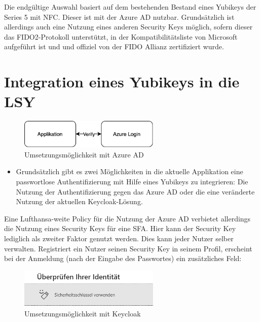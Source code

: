 Die endgültige Auswahl basiert  auf dem bestehenden Bestand eines Yubikeys der Series 5 mit NFC. Dieser ist mit der Azure \ac{AD} nutzbar. Grundsätzlich ist allerdings auch eine Nutzung eines anderen Security Keys möglich, sofern dieser das \ac{FIDO}2-Protokoll unterstützt, in der Kompatibilitätsliste von Microsoft aufgeführt ist und und offiziel von der \ac{FIDO} Allianz zertifiziert wurde.

\section{Integration eines Yubikeys in die LSY}

\begin{figure}[h]
	\centering 
	\includegraphics[width=0.6\textwidth]{img/abbildungen/azure_umsetzung.png}
	\captionsetup{format=hang}
	\caption{Umsetzungsmöglichkeit mit Azure \ac{AD}}
\end{figure}

\begin{itemize}
    \item Grundsätzlich gibt es zwei Möglichkeiten in die aktuelle Applikation eine passwortlose Authentifizierung mit Hilfe eines Yubikeys zu integrieren: Die Nutzung der Authentifizierung gegen das Azure \ac{AD} oder die eine veränderte Nutzung der aktuellen Keycloak-Lösung.

\end{itemize}

Eine Lufthansa-weite Policy für die Nutzung der Azure \ac{AD} verbietet allerdings die Nutzung eines Security Keys für eine \ac{SFA}. Hier kann der Security Key lediglich als zweiter Faktor genutzt werden. Dies kann jeder Nutzer selber verwalten. Registriert ein Nutzer seinen Security Key in seinem Profil, erscheint bei der Anmeldung (nach der Eingabe des Passwortes) ein zusätzliches Feld:

\begin{figure}[h]
	\centering 
	\includegraphics[width=0.6\textwidth]{img/abbildungen/azure_seckey.png}
	\captionsetup{format=hang}
	\caption{Umsetzungsmöglichkeit mit Keycloak}
\end{figure}

